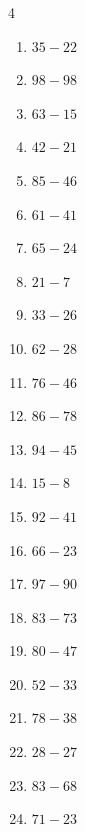 \begin{multicols}{4}
\begin{enumerate}
  \item $35-22$
        \phantom{$=13$}

  \item $98-98$
        \phantom{$=0$}

  \item $63-15$
        \phantom{$=48$}

  \item $42-21$
        \phantom{$=21$}

  \item $85-46$
        \phantom{$=39$}

  \item $61-41$
        \phantom{$=20$}

  \item $65-24$
        \phantom{$=41$}

  \item $21-7$
        \phantom{$=14$}

  \item $33-26$
        \phantom{$=7$}

  \item $62-28$
        \phantom{$=34$}

  \item $76-46$
        \phantom{$=30$}

  \item $86-78$
        \phantom{$=8$}

  \item $94-45$
        \phantom{$=49$}

  \item $15-8$
        \phantom{$=7$}

  \item $92-41$
        \phantom{$=51$}

  \item $66-23$
        \phantom{$=43$}

  \item $97-90$
        \phantom{$=7$}

  \item $83-73$
        \phantom{$=10$}

  \item $80-47$
        \phantom{$=33$}

  \item $52-33$
        \phantom{$=19$}

  \item $78-38$
        \phantom{$=40$}

  \item $28-27$
        \phantom{$=1$}

  \item $83-68$
        \phantom{$=15$}

  \item $71-23$
        \phantom{$=48$}

\end{enumerate}
\end{multicols}

